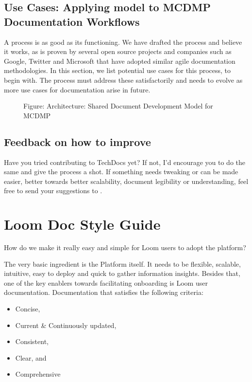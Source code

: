 \documentclass[letterpaper,10pt,english]{sphinxmanual}
\begin{document}
\section{Use Cases: Applying model to MCDMP Documentation Workflows}
\label{\detokenize{mcdmp_docx_res:use-cases-applying-model-to-mcdmp-documentation-workflows}}
A process is as good as its functioning.  We have drafted the process and believe it works, as is proven by several open source projects and companies such as Google, Twitter and Microsoft that have adopted similar agile documentation methodologies.  In this section, we list potential use cases for this process, to begin with.  The process must address these satisfactorily and needs to evolve as more use cases for documentation arise in future.

\begin{figure}[htbp]
\centering
\capstart

\noindent{}
\caption{Figure: Architecture: Shared Document Development Model for MCDMP}\label{\detokenize{mcdmp_docx_res:id9}}\end{figure}


\section{Feedback on how to improve}
\label{\detokenize{mcdmp_docx_res:feedback-on-how-to-improve}}
Have you tried contributing to TechDocs yet? If not, I’d encourage you to do the same and give the process a shot.  If something needs tweaking or can be made easier, better towards better scalability, document legibility or understanding, feel free to send your suggestions to .


\chapter{Loom Doc Style Guide}
\label{\detokenize{mcdmp_docx_res:loom-doc-style-guide}}
How do we make it really easy and simple for Loom users to adopt the platform?

The very basic ingredient is the Platform itself. It needs to be flexible, scalable, intuitive, easy to deploy and quick to gather information insights. Besides that, one of the key enablers towards facilitating onboarding is Loom user documentation. Documentation that satisfies the following criteria:
\begin{itemize}
\item {} 
Concise,

\item {} 
Current \& Continuously updated,

\item {} 
Consistent,

\item {} 
Clear, and

\item {} 
Comprehensive

\end{itemize}
\end{document}
